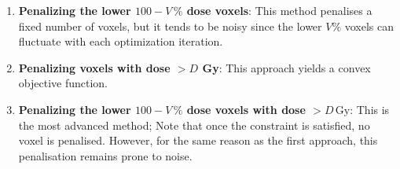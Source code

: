 \begin{enumerate}
	\item \textbf{Penalizing the lower $100-V\,\%$ dose voxels}:
	This method penalises a fixed number of voxels, but it tends to be noisy since the lower $V\%$ voxels can fluctuate with each optimization iteration.
	\item \textbf{Penalizing voxels with dose $>D$ Gy}:
	This approach yields a convex objective function.
	\item \textbf{Penalizing the lower $100-V\,\%$ dose voxels with dose $>D\,\text{Gy}$}:
	This is the most advanced method; 
	Note that once the constraint is satisfied, no voxel is penalised.
	However, for the same reason as the first approach, this penalisation remains prone to noise.
\end{enumerate}

